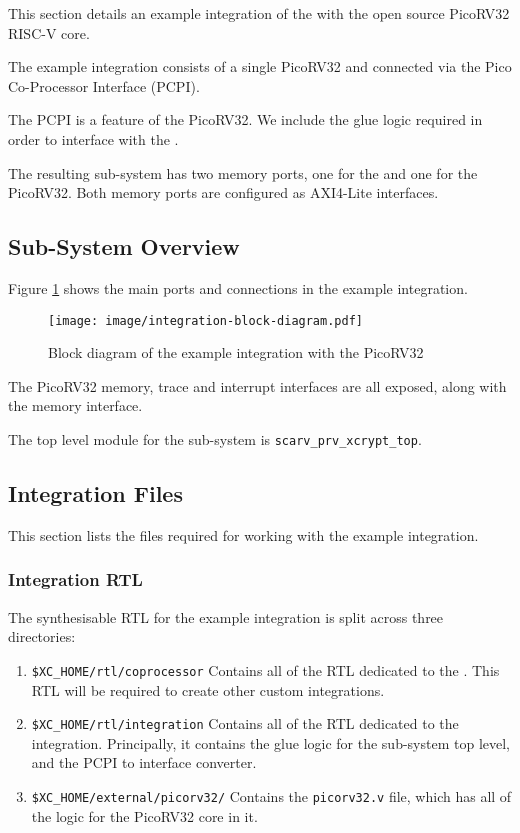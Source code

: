 
This section details an example integration of the \COP with
the open source PicoRV32 RISC-V core.

The example integration consists of a single PicoRV32 and \COP
connected via the Pico Co-Processor Interface (PCPI).

The PCPI is a feature of the PicoRV32.
We include the glue logic required in order to interface with the \COP.

The resulting sub-system has two memory ports, one for the \COP and one
for the PicoRV32.
Both memory ports are configured as AXI4-Lite interfaces.

\subsection{Sub-System Overview}

Figure \ref{fig:integration-block} shows the main ports and connections in
the example integration.

\begin{figure}[h]
\centering
\texttt{[image: image/integration-block-diagram.pdf]}
\caption{Block diagram of the example \COP integration with the PicoRV32}
\label{fig:integration-block}
\end{figure}

The PicoRV32 memory, trace and interrupt interfaces are all exposed, along
with the \COP memory interface.

The top level module for the sub-system is {\tt scarv\_prv\_xcrypt\_top}.


\subsection{Integration Files}

This section lists the files required for working with the example
integration.

\subsubsection{Integration RTL}

The synthesisable RTL for the example integration is split across three
directories:

\begin{enumerate}
\item {\tt \$XC\_HOME/rtl/coprocessor} Contains all of the RTL dedicated
    to the \COP.
    This RTL will be required to create other custom integrations.
\item {\tt \$XC\_HOME/rtl/integration} Contains all of the RTL dedicated
    to the integration.
    Principally, it contains the glue logic for the
    sub-system top level, and the PCPI to \COP interface converter.
\item {\tt \$XC\_HOME/external/picorv32/} Contains the {\tt picorv32.v}
    file, which has all of the logic for the PicoRV32 core in it.
\end{enumerate}

